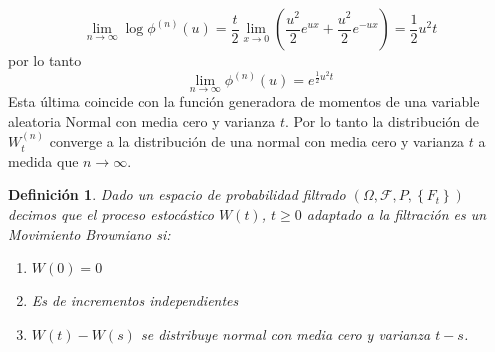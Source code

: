 \documentclass{extreport}
\theoremstyle{definicion}
\newtheorem{definition}{Definición}[chapter]
\theoremstyle{propiedad}
\theoremstyle{teorema}
\begin{document}
$$
\lim_{n\rightarrow\infty}\log\phi^{(n)}(u)  = \frac{t}{2}\lim_{x\rightarrow 0}\left(\frac{u^2}{2}e^{ux} + \frac{u^2}{2}e^{-ux}\right) = \frac{1}{2}u^2t
$$
por lo tanto
$$
\lim_{n\rightarrow\infty}\phi^{(n)}(u)  = e^{\frac{1}{2}u^2t}
$$
Esta última coincide con la función generadora de momentos de una variable aleatoria Normal con media cero y varianza $t$. Por lo tanto la distribución de $W_t^{(n)}$ converge a la distribución de una normal con media cero y varianza $t$ a medida que $n\rightarrow\infty$.
\newpage
\begin{definition}
    Dado un espacio de probabilidad filtrado $(\Omega,\mathcal{F}, P, \left\{F_t\right\})$ decimos que el proceso estocástico $W(t)$, $t\geq 0$ adaptado a la filtración es un \emph{Movimiento Browniano} si:
    \begin{enumerate}
        \item $W(0) = 0$
        \item Es de incrementos independientes
        \item $W(t)-W(s)$ se distribuye normal con media cero y varianza $t-s$.
    \end{enumerate}
\end{definition}
\end{document}
